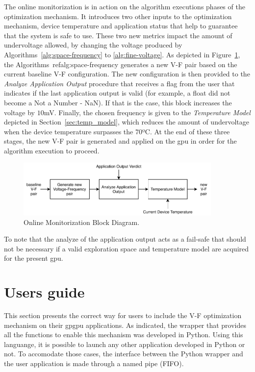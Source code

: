 The online monitorization is in action on the algorithm executions phases of the optimization mechanism. It introduces two other inputs to the optimization mechanism, device temperature and application status that help to guarantee that the system is safe to use. These two new metrics impact the amount of undervoltage allowed, by changing the voltage produced by Algorithms~\ref{alg:space-frequency} to \ref{alg:fine-voltage}. As depicted in Figure~\ref{fig:monitorization}, the Algorithms~ref{alg:space-frequency} generates a new V-F pair based on the current baseline V-F configuration. The new configuration is then provided to the \textit{Analyze Application Output} procedure that receives a flag from the user that indicates if the last application output is valid (for example, a float did not become a Not a Number - NaN). If that is the case, this block increases the voltage by $10$mV. Finally, the chosen frequency is given to the \textit{Temperature Model} depicted in Section~\ref{sec:temp_model}, which reduces the amount of undervoltage when the device temperature surpasses the 70ºC.  At the end of these three stages, the new V-F pair is generated and applied on the \acrshort{gpu} in order for the algorithm execution to proceed.

\begin{figure}[htb]
  \centering
  \includegraphics[width=0.9\textwidth]{Figures/Optimization/online_monitoring.pdf}
  \caption{Online Monitorization Block Diagram.}
  \label{fig:monitorization}
\end{figure}



To note that the analyze of the application output acts as a fail-safe that should not be necessary if a valid exploration space and temperature model are acquired for the present \acrshort{gpu}.



\section{Users guide}
\label{sec:usage}

This section presents the correct way for users to include the V-F optimization mechanism on their \acrshort{gpgpu} applications. As indicated, the wrapper that provides all the functions to enable this mechanism was developed in Python. Using this languange, it is possible to launch any other application developed in Python or not. To accomodate those cases, the interface between the Python wrapper and the user application is made through a named pipe (FIFO).

